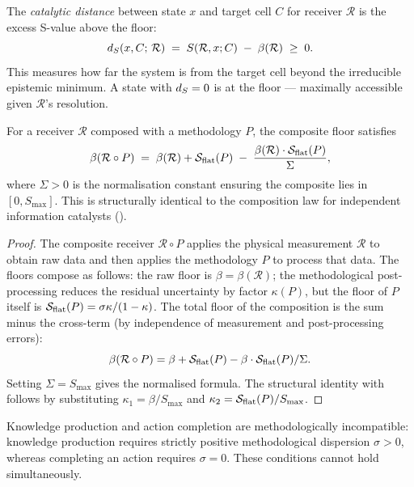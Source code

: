 \begin{definition}
\label{def:catalytic-distance}
The \emph{catalytic distance} between state $x$ and target cell $C$ for
receiver $\mathcal{R}$ is the excess S-value above the floor:
\[
  d_S(x, C;\, \mathcal{R}) \;=\; S(\mathcal{R}, x; C) \;-\; \beta(\mathcal{R}) \;\geq\; 0 .
\]
This measures how far the system is from the target cell beyond the irreducible
epistemic minimum.  A state with $d_S = 0$ is at the floor — maximally
accessible given $\mathcal{R}$'s resolution.
\end{definition}

\begin{theorem}
\label{thm:mode-method-equiv}
For a receiver $\mathcal{R}$ composed with a methodology $P$, the composite
floor satisfies
\[
  \beta(\mathcal{R} \circ P)
  \;=\; \beta(\mathcal{R}) + \mathcal{S}_{\mathrm{flat}}(P)
  \;-\; \frac{\beta(\mathcal{R}) \cdot \mathcal{S}_{\mathrm{flat}}(P)}{\Sigma} ,
\]
where $\Sigma > 0$ is the normalisation constant ensuring the composite lies
in $[0, S_{\max}]$.  This is structurally identical to the composition law for
independent information catalysts ().
\end{theorem}

\begin{proof}
The composite receiver $\mathcal{R} \circ P$ applies the physical measurement
$\mathcal{R}$ to obtain raw data and then applies the methodology $P$ to
process that data.  The floors compose as follows: the raw floor is $\beta
= \beta(\mathcal{R})$; the methodological post-processing reduces the residual
uncertainty by factor $\kappa(P)$, but the floor of $P$ itself is
$\mathcal{S}_{\mathrm{flat}}(P) = \sigma\kappa/(1-\kappa)$.  The total floor of the
composition is the sum minus the cross-term (by independence of measurement
and post-processing errors):
\[
  \beta(\mathcal{R} \circ P)
  = \beta + \mathcal{S}_{\mathrm{flat}}(P) - \beta \cdot \mathcal{S}_{\mathrm{flat}}(P) / \Sigma .
\]
Setting $\Sigma = S_{\max}$ gives the normalised formula.  The structural
identity with  follows by substituting
$\kappa_1 = \beta / S_{\max}$ and $\kappa_2 = \mathcal{S}_{\mathrm{flat}}(P)/S_{\max}$.
\end{proof}

\begin{theorem}
\label{thm:method-incompatibility}
Knowledge production and action completion are methodologically incompatible:
knowledge production requires strictly positive methodological dispersion
$\sigma > 0$, whereas completing an action requires $\sigma = 0$.  These
conditions cannot hold simultaneously.
\end{theorem}

